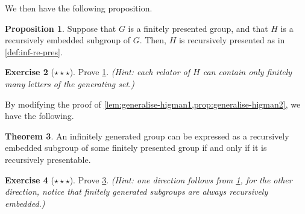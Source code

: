 \documentclass[11pt,a4paper,reqno]{amsart}
\theoremstyle{plain}
\theoremstyle{definition}
\newtheorem{theorem}{Theorem}[section]
\newtheorem{proposition}[theorem]{Proposition}
\theoremstyle{definition}
\newtheorem{exercise}[theorem]{Exercise}
\newcommand\exerciseLevelHard{$\star${\,}$\star${\,}$\star$}
\begin{document}
We then have the following proposition.

\begin{proposition}\label{prop:generalise-higman2}
  Suppose that $G$ is a finitely presented group, and that $H$ is a recursively embedded subgroup of $G$.
  Then, $H$ is recursively presented as in \cref{def:inf-re-pres}.
\end{proposition}

\begin{exercise}[\exerciseLevelHard]
  Prove \cref{prop:generalise-higman2}.
\textit{(Hint: each relator of $H$ can contain only finitely many letters of the generating set.)}
\end{exercise}

By modifying the proof of \cref{lem:generalise-higman1,prop:generalise-higman2}, we have the following.

\begin{theorem}\label{thm:generalise-higman3}
	An infinitely generated group can be expressed as a recursively embedded subgroup of some finitely presented group if and only if it is recursively presentable.
\end{theorem}

\begin{exercise}[\exerciseLevelHard]
  Prove \cref{thm:generalise-higman3}.
  \textit{(Hint: one direction follows from \cref{prop:generalise-higman2}, for the other direction, notice that finitely generated subgroups are always recursively embedded.)}
\end{exercise}
\end{document}
